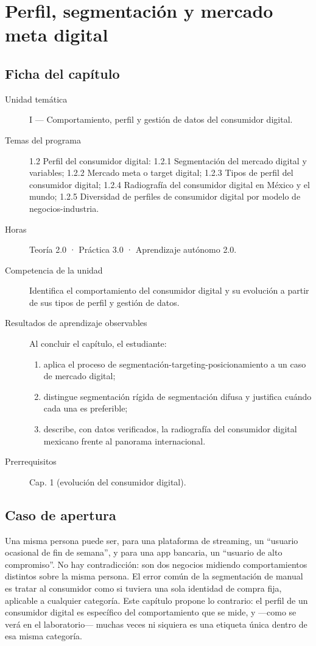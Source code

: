 \chapter{Perfil, segmentación y mercado meta digital}
\label{cap:02}

\section*{Ficha del capítulo}
\begin{description}
  \item[Unidad temática] I — Comportamiento, perfil y gestión de datos del consumidor digital.
  \item[Temas del programa] 1.2 Perfil del consumidor digital: 1.2.1 Segmentación del mercado digital y variables; 1.2.2 Mercado meta o target digital; 1.2.3 Tipos de perfil del consumidor digital; 1.2.4 Radiografía del consumidor digital en México y el mundo; 1.2.5 Diversidad de perfiles de consumidor digital por modelo de negocios-industria.
  \item[Horas] Teoría 2.0 · Práctica 3.0 · Aprendizaje autónomo 2.0.
  \item[Competencia de la unidad] Identifica el comportamiento del consumidor digital y su evolución a partir de sus tipos de perfil y gestión de datos.
  \item[Resultados de aprendizaje observables] Al concluir el capítulo, el estudiante:
  \begin{enumerate}
    \item aplica el proceso de segmentación-targeting-posicionamiento a un caso de mercado digital;
    \item distingue segmentación rígida de segmentación difusa y justifica cuándo cada una es preferible;
    \item describe, con datos verificados, la radiografía del consumidor digital mexicano frente al panorama internacional.
  \end{enumerate}
  \item[Prerrequisitos] Cap. 1 (evolución del consumidor digital).
\end{description}

\section{Caso de apertura}

Una misma persona puede ser, para una plataforma de streaming, un
\enquote{usuario ocasional de fin de semana}, y para una app bancaria, un
\enquote{usuario de alto compromiso}. No hay contradicción: son dos negocios
midiendo comportamientos distintos sobre la misma persona. El error común de
la segmentación de manual es tratar al consumidor como si tuviera una sola
identidad de compra fija, aplicable a cualquier categoría. Este capítulo
propone lo contrario: el perfil de un consumidor digital es específico del
comportamiento que se mide, y —como se verá en el laboratorio— muchas veces
ni siquiera es una etiqueta única dentro de esa misma categoría.

